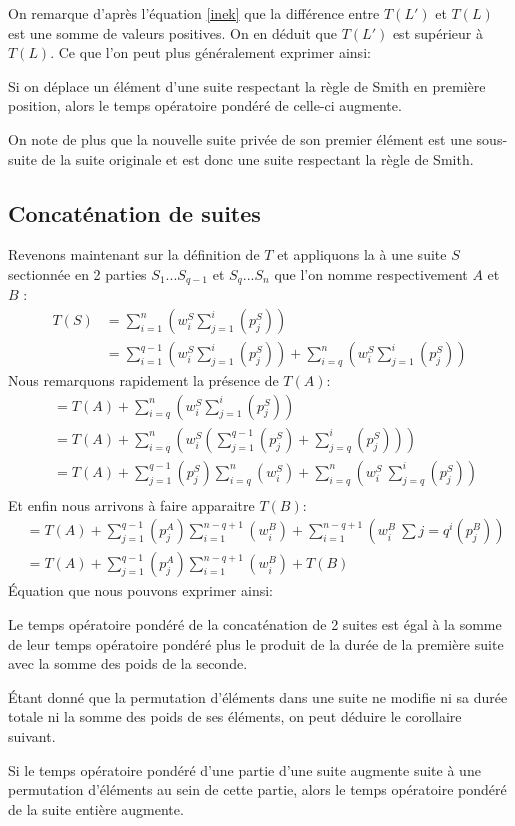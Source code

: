 On remarque d'après l'équation \eqref{inek} que la différence entre $T(L')$ et 
$T(L)$ est une somme de valeurs positives. On en déduit que $T(L')$ est 
supérieur à $T(L)$. Ce que l'on peut plus généralement exprimer ainsi:
\begin{lem}\label{lem1}
Si on déplace un élément d'une suite respectant la règle de Smith en première 
position, alors le temps opératoire pondéré de celle-ci augmente.
\end{lem}
On note de plus que la nouvelle suite privée de son premier élément est une 
sous-suite de la suite originale et est donc une suite respectant la règle de 
Smith.

\subsection{Concaténation de suites}
Revenons maintenant sur la définition de $T$ et appliquons la à une suite $S$ 
sectionnée en 2 parties $S_1...S_{q-1}$ et $S_q...S_n$ que l'on nomme 
respectivement $A$ et $B$ :
\begin{align}
T(S) &= \sum_{i=1}^n \left(w^S_i\sum_{j=1}^i\left(p^S_j\right)\right) \\
&= \sum_{i=1}^{q-1} \left(w^S_i\sum_{j=1}^i\left(p^S_j\right)\right) 
+ \sum_{i=q}^n \left(w^S_i\sum_{j=1}^i\left(p^S_j\right)\right)
\end{align}
Nous remarquons rapidement la présence de $T(A)$:
\begin{align}
&= T(A) + \sum_{i=q}^n \left(w^S_i\sum_{j=1}^i\left(p^S_j\right)\right) \\
&= T(A) + \sum_{i=q}^n \left(w^S_i\left( \sum_{j=1}^{q-1}\left(p^S_j\right) 
+  \sum_{j=q}^i\left(p^S_j\right) \right)\right) \\
&= T(A) + \sum_{j=1}^{q-1}\left(p^S_j\right) \sum_{i=q}^n \left(w^S_i\right) +
\sum_{i=q}^n \left(w^S_i\ \sum_{j=q}^i\left(p^S_j\right)\right) \\
\end{align}
Et enfin nous arrivons à faire apparaitre $T(B)$:
\begin{align}
&=  T(A) + \sum_{j=1}^{q-1}\left(p^A_j\right) \sum_{i=1}^{n-q+1} 
\left(w^B_i\right) +
\sum_{i=1}^{n-q+1} \left(w^B_i\ \sum{j=q}^i\left(p^B_j\right)\right) \\
&= T(A) + \sum_{j=1}^{q-1}\left(p^A_j\right) \sum_{i=1}^{n-q+1} 
\left(w^B_i\right) + T(B)
\end{align}
Équation que nous pouvons exprimer ainsi:
\begin{lem}\label{lem2}
Le temps opératoire pondéré de la concaténation de 2 suites est égal à la somme  
de leur temps opératoire pondéré plus le produit de la durée de la première 
suite avec la somme des poids de la seconde.\end{lem}
Étant donné que la permutation d'éléments dans une suite ne modifie ni sa durée 
totale ni la somme des poids de ses éléments, on peut déduire le corollaire 
suivant.
\begin{cor}\label{lem3}
Si le temps opératoire pondéré d'une partie d'une suite augmente suite à une 
permutation d'éléments au sein de cette partie, alors le temps opératoire 
pondéré de la suite entière augmente.
\end{cor}

